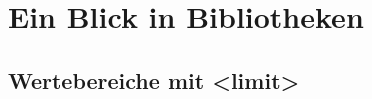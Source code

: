 \documentclass[a4paper]{report}
\begin{document}
\chapter{Ein Blick in Bibliotheken}

\section{Wertebereiche mit <limit>}

	

\end{document}
